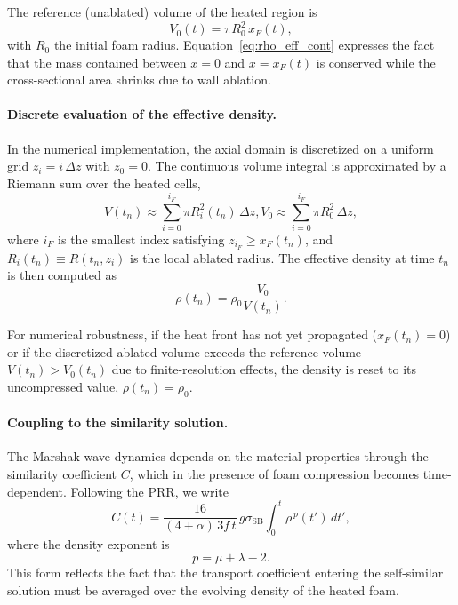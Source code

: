 \documentclass{article}
\begin{document}
The reference (unablated) volume of the heated region is
\begin{equation}
V_0(t) = \pi R_0^2\,x_F(t),
\label{eq:V0}
\end{equation}
with $R_0$ the initial foam radius. Equation~\eqref{eq:rho_eff_cont} expresses the fact that the mass contained between $x=0$ and $x=x_F(t)$ is conserved while the cross-sectional area shrinks due to wall ablation.

\paragraph{Discrete evaluation of the effective density.}
In the numerical implementation, the axial domain is discretized on a uniform grid $z_i=i\,\Delta z$ with $z_0=0$. The continuous volume integral is approximated by a Riemann sum over the heated cells,
\begin{equation}
V(t_n) \approx \sum_{i=0}^{i_F} \pi R_i^2(t_n)\,\Delta z,
V_0 \approx \sum_{i=0}^{i_F} \pi R_0^2\,\Delta z,
\label{eq:V_discrete}
\end{equation}
where $i_F$ is the smallest index satisfying $z_{i_F}\ge x_F(t_n)$, and $R_i(t_n)\equiv R(t_n,z_i)$ is the local ablated radius. The effective density at time $t_n$ is then computed as
\begin{equation}
\rho(t_n)
= \rho_0 \frac{V_0}{V(t_n)}.
\label{eq:rho_eff_discrete}
\end{equation}

For numerical robustness, if the heat front has not yet propagated ($x_F(t_n)=0$) or if the discretized ablated volume exceeds the reference volume $V(t_n)>V_0(t_n)$ due to finite-resolution effects, the density is reset to its uncompressed value, $\rho(t_n)=\rho_0$.

\paragraph{Coupling to the similarity solution.}
The Marshak-wave dynamics depends on the material properties through the similarity coefficient $C$, which in the presence of foam compression becomes time-dependent. Following the PRR, we write
\begin{equation}
C(t)
= \frac{16}{(4+\alpha)\,3f\,t}\,
g\sigma_{\mathrm{SB}}
\int_0^t \rho^{\,p}(t')\,dt',
\label{eq:C_time_dep}
\end{equation}
where the density exponent is
\begin{equation}
p = \mu + \lambda - 2 .
\end{equation}
This form reflects the fact that the transport coefficient entering the self-similar solution must be averaged over the evolving density of the heated foam.
\end{document}
